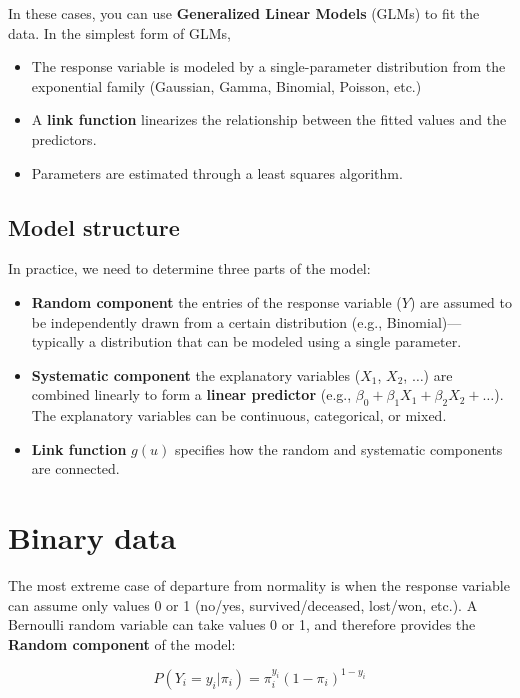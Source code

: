 \documentclass[
  letterpaper,
  DIV=11,
  numbers=noendperiod]{scrreprt}
\providecommand{\tightlist}{%
  \setlength{\itemsep}{0pt}\setlength{\parskip}{0pt}}\usepackage{longtable,booktabs,array}
\begin{document}
In these cases, you can use \textbf{Generalized Linear Models} (GLMs) to
fit the data. In the simplest form of GLMs,

\begin{itemize}
\tightlist
\item
  The response variable is modeled by a single-parameter distribution
  from the exponential family (Gaussian, Gamma, Binomial, Poisson, etc.)
\item
  A \textbf{link function} linearizes the relationship between the
  fitted values and the predictors.
\item
  Parameters are estimated through a least squares algorithm.
\end{itemize}

\subsection{Model structure}\label{model-structure}

In practice, we need to determine three parts of the model:

\begin{itemize}
\tightlist
\item
  \textbf{Random component} the entries of the response variable (\(Y\))
  are assumed to be independently drawn from a certain distribution
  (e.g., Binomial)---typically a distribution that can be modeled using
  a single parameter.
\item
  \textbf{Systematic component} the explanatory variables (\(X_1\),
  \(X_2\), \(\ldots\)) are combined linearly to form a \textbf{linear
  predictor} (e.g., \(\beta_0 + \beta_1 X_1 + \beta_2 X_2 + \ldots\)).
  The explanatory variables can be continuous, categorical, or mixed.
\item
  \textbf{Link function} \(g(u)\) specifies how the random and
  systematic components are connected.
\end{itemize}

\section{Binary data}\label{binary-data}

The most extreme case of departure from normality is when the response
variable can assume only values 0 or 1 (no/yes, survived/deceased,
lost/won, etc.). A Bernoulli random variable can take values 0 or 1, and
therefore provides the \textbf{Random component} of the model:

\[
P(Y_i = y_i | \pi_i) = \pi_i^{y_i} (1 - \pi_i)^{1 - y_i}
\]
\end{document}
